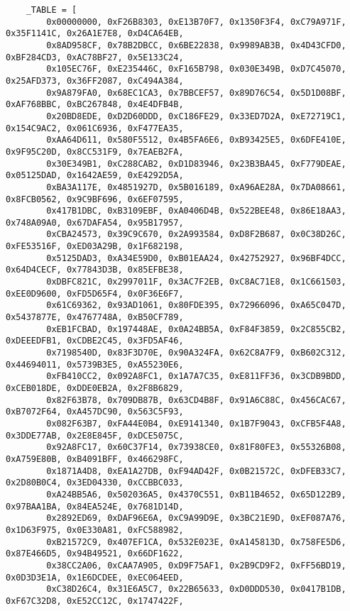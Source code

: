 \begin{samepage}
\begin{verbatim}
    _TABLE = [
        0x00000000, 0xF26B8303, 0xE13B70F7, 0x1350F3F4, 0xC79A971F, 0x35F1141C, 0x26A1E7E8, 0xD4CA64EB,
        0x8AD958CF, 0x78B2DBCC, 0x6BE22838, 0x9989AB3B, 0x4D43CFD0, 0xBF284CD3, 0xAC78BF27, 0x5E133C24,
        0x105EC76F, 0xE235446C, 0xF165B798, 0x030E349B, 0xD7C45070, 0x25AFD373, 0x36FF2087, 0xC494A384,
        0x9A879FA0, 0x68EC1CA3, 0x7BBCEF57, 0x89D76C54, 0x5D1D08BF, 0xAF768BBC, 0xBC267848, 0x4E4DFB4B,
        0x20BD8EDE, 0xD2D60DDD, 0xC186FE29, 0x33ED7D2A, 0xE72719C1, 0x154C9AC2, 0x061C6936, 0xF477EA35,
        0xAA64D611, 0x580F5512, 0x4B5FA6E6, 0xB93425E5, 0x6DFE410E, 0x9F95C20D, 0x8CC531F9, 0x7EAEB2FA,
        0x30E349B1, 0xC288CAB2, 0xD1D83946, 0x23B3BA45, 0xF779DEAE, 0x05125DAD, 0x1642AE59, 0xE4292D5A,
        0xBA3A117E, 0x4851927D, 0x5B016189, 0xA96AE28A, 0x7DA08661, 0x8FCB0562, 0x9C9BF696, 0x6EF07595,
        0x417B1DBC, 0xB3109EBF, 0xA0406D4B, 0x522BEE48, 0x86E18AA3, 0x748A09A0, 0x67DAFA54, 0x95B17957,
        0xCBA24573, 0x39C9C670, 0x2A993584, 0xD8F2B687, 0x0C38D26C, 0xFE53516F, 0xED03A29B, 0x1F682198,
        0x5125DAD3, 0xA34E59D0, 0xB01EAA24, 0x42752927, 0x96BF4DCC, 0x64D4CECF, 0x77843D3B, 0x85EFBE38,
        0xDBFC821C, 0x2997011F, 0x3AC7F2EB, 0xC8AC71E8, 0x1C661503, 0xEE0D9600, 0xFD5D65F4, 0x0F36E6F7,
        0x61C69362, 0x93AD1061, 0x80FDE395, 0x72966096, 0xA65C047D, 0x5437877E, 0x4767748A, 0xB50CF789,
        0xEB1FCBAD, 0x197448AE, 0x0A24BB5A, 0xF84F3859, 0x2C855CB2, 0xDEEEDFB1, 0xCDBE2C45, 0x3FD5AF46,
        0x7198540D, 0x83F3D70E, 0x90A324FA, 0x62C8A7F9, 0xB602C312, 0x44694011, 0x5739B3E5, 0xA55230E6,
        0xFB410CC2, 0x092A8FC1, 0x1A7A7C35, 0xE811FF36, 0x3CDB9BDD, 0xCEB018DE, 0xDDE0EB2A, 0x2F8B6829,
        0x82F63B78, 0x709DB87B, 0x63CD4B8F, 0x91A6C88C, 0x456CAC67, 0xB7072F64, 0xA457DC90, 0x563C5F93,
        0x082F63B7, 0xFA44E0B4, 0xE9141340, 0x1B7F9043, 0xCFB5F4A8, 0x3DDE77AB, 0x2E8E845F, 0xDCE5075C,
        0x92A8FC17, 0x60C37F14, 0x73938CE0, 0x81F80FE3, 0x55326B08, 0xA759E80B, 0xB4091BFF, 0x466298FC,
        0x1871A4D8, 0xEA1A27DB, 0xF94AD42F, 0x0B21572C, 0xDFEB33C7, 0x2D80B0C4, 0x3ED04330, 0xCCBBC033,
        0xA24BB5A6, 0x502036A5, 0x4370C551, 0xB11B4652, 0x65D122B9, 0x97BAA1BA, 0x84EA524E, 0x7681D14D,
        0x2892ED69, 0xDAF96E6A, 0xC9A99D9E, 0x3BC21E9D, 0xEF087A76, 0x1D63F975, 0x0E330A81, 0xFC588982,
        0xB21572C9, 0x407EF1CA, 0x532E023E, 0xA145813D, 0x758FE5D6, 0x87E466D5, 0x94B49521, 0x66DF1622,
        0x38CC2A06, 0xCAA7A905, 0xD9F75AF1, 0x2B9CD9F2, 0xFF56BD19, 0x0D3D3E1A, 0x1E6DCDEE, 0xEC064EED,
        0xC38D26C4, 0x31E6A5C7, 0x22B65633, 0xD0DDD530, 0x0417B1DB, 0xF67C32D8, 0xE52CC12C, 0x1747422F,

\end{verbatim}
\end{samepage}
